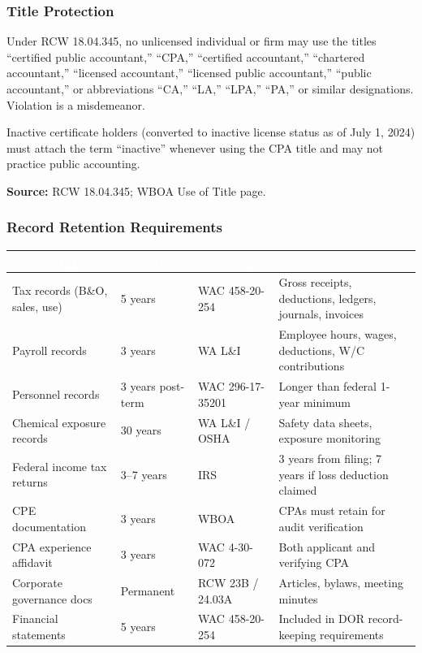 \documentclass[11pt,letterpaper]{article}
\newcommand{\tableheader}[1]{\textbf{\sffamily\textcolor{white}{#1}}}
\begin{document}
\subsubsection{Title Protection}

Under RCW 18.04.345, no unlicensed individual or firm may use the titles ``certified public accountant,'' ``CPA,'' ``certified accountant,'' ``chartered accountant,'' ``licensed accountant,'' ``licensed public accountant,'' ``public accountant,'' or abbreviations ``CA,'' ``LA,'' ``LPA,'' ``PA,'' or similar designations. Violation is a misdemeanor.

Inactive certificate holders (converted to inactive license status as of July 1, 2024) must attach the term ``inactive'' whenever using the CPA title and may not practice public accounting.

\textbf{Source:} RCW 18.04.345; WBOA Use of Title page.

\subsubsection{Record Retention Requirements}

\begin{center}
\begin{tabularx}{\textwidth}{L{4cm}C{2.5cm}L{2.5cm}X}
\toprule
{}
\tableheader{Record Type} & \tableheader{Retention} & \tableheader{Authority} & \tableheader{Notes} \\
\midrule
Tax records (B\&O, sales, use) & 5 years & WAC 458-20-254 & Gross receipts, deductions, ledgers, journals, invoices \\
Payroll records & 3 years & WA L\&I & Employee hours, wages, deductions, W/C contributions \\
Personnel records & 3 years post-term & WAC 296-17-35201 & Longer than federal 1-year minimum \\
Chemical exposure records & 30 years & WA L\&I / OSHA & Safety data sheets, exposure monitoring \\
Federal income tax returns & 3--7 years & IRS & 3 years from filing; 7 years if loss deduction claimed \\
CPE documentation & 3 years & WBOA & CPAs must retain for audit verification \\
CPA experience affidavit & 3 years & WAC 4-30-072 & Both applicant and verifying CPA \\
Corporate governance docs & Permanent & RCW 23B / 24.03A & Articles, bylaws, meeting minutes \\
Financial statements & 5 years & WAC 458-20-254 & Included in DOR record-keeping requirements \\
\bottomrule
\end{tabularx}
\end{center}
\end{document}
